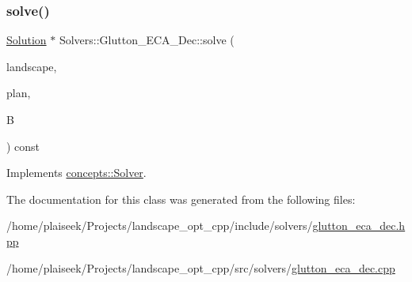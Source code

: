 \subsubsection{\texorpdfstring{solve()}{solve()}}
{\footnotesize\ttfamily \hyperlink{class_solution}{Solution} $\ast$ Solvers\+::\+Glutton\+\_\+\+E\+C\+A\+\_\+\+Dec\+::solve (\begin{DoxyParamCaption}\item[{const \hyperlink{class_landscape}{Landscape} \&}]{landscape,  }\item[{const \hyperlink{class_restoration_plan}{Restoration\+Plan} \&}]{plan,  }\item[{const double}]{B }\end{DoxyParamCaption}) const\hspace{0.3cm}{\ttfamily [virtual]}}



Implements \hyperlink{classconcepts_1_1_solver_af323ad29df1e7b87facd7dc007568c80}{concepts\+::\+Solver}.



The documentation for this class was generated from the following files\+:\begin{DoxyCompactItemize}
\item 
/home/plaiseek/\+Projects/landscape\+\_\+opt\+\_\+cpp/include/solvers/\hyperlink{glutton__eca__dec_8hpp}{glutton\+\_\+eca\+\_\+dec.\+hpp}\item 
/home/plaiseek/\+Projects/landscape\+\_\+opt\+\_\+cpp/src/solvers/\hyperlink{glutton__eca__dec_8cpp}{glutton\+\_\+eca\+\_\+dec.\+cpp}\end{DoxyCompactItemize}
